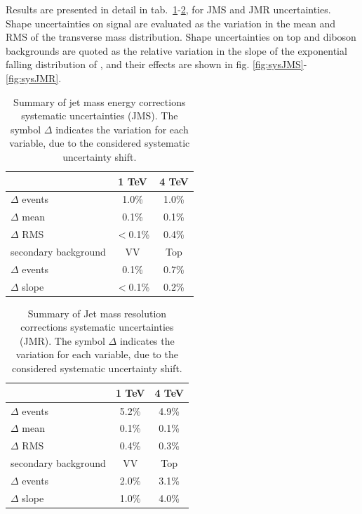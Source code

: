 \noindent Results are presented in detail in tab.~\ref{tab:jet_mass_energy_corr}-\ref{tab:jet_mass_res_corr}, for JMS and JMR uncertainties. Shape uncertainties on signal are evaluated as the variation in the mean and RMS of the transverse mass distribution. Shape uncertainties on top and diboson backgrounds are quoted as the relative variation in the slope of the exponential falling distribution of \mtVZ, and their effects are shown in fig. \ref{fig:sysJMS}-\ref{fig:sysJMR}.


\begin{table}[!htb]
  \centering
  \begin{tabular}{l|cc}
	\hline
	\mtVZ & 1 TeV & 4 TeV \\
        \hline
	$\Delta$ events & 1.0\% & 1.0\% \\
	$\Delta$ mean & 0.1\%& 0.1\% \\
	$\Delta$ RMS & $<$0.1\% & 0.4\% \\
	\hline
	secondary background & VV & Top \\
        \hline
	$\Delta$ events & 0.1\% & 0.7\% \\
	$\Delta$ slope & $<$0.1\% & 0.2\% \\
	\hline
  \end{tabular}
  \caption{Summary of jet mass energy corrections systematic uncertainties (JMS). The symbol $\Delta$ indicates the variation for each variable, due to the considered systematic uncertainty shift. \label{tab:jet_mass_energy_corr}}
\end{table}


\begin{table}[!htb]
  \centering
  \begin{tabular}{l|cc}
	\hline
	\mX & 1 TeV & 4 TeV \\
        \hline
	$\Delta$ events & 5.2\% & 4.9\% \\
	$\Delta$ mean & 0.1\%& 0.1\% \\
	$\Delta$ RMS & 0.4\% & 0.3\% \\
	\hline
	secondary background & VV & Top \\
        \hline
	$\Delta$ events & 2.0\% & 3.1\% \\
	$\Delta$ slope & 1.0\% & 4.0\% \\
	\hline
  \end{tabular}
  \caption{Summary of Jet mass resolution corrections systematic uncertainties (JMR). The symbol $\Delta$ indicates the variation for each variable, due to the considered systematic uncertainty shift. \label{tab:jet_mass_res_corr}}
\end{table}

